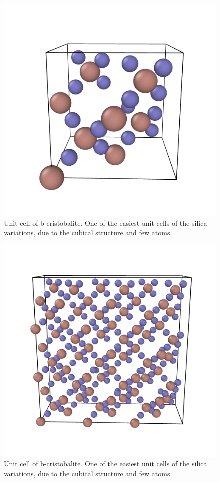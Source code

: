 \documentclass[twoside,english]{uiofysmaster}
\begin{document}
\begin{figure}[H]
\centering
\includegraphics[width=0.7\linewidth]{figures/unitcell/unitcell2.png}
\caption{Unit cell of b-cristobalite. One of the easiest unit cells of the silica variations, due to the cubical structure and few atoms.}
\label{fig:unitcellbcristobalite}
\end{figure}
\begin{figure}[H]
	\centering
	\includegraphics[width=0.7\linewidth]{figures/unitcell/combiningCells.png}
	\caption{Unit cell of b-cristobalite. One of the easiest unit cells of the silica variations, due to the cubical structure and few atoms.}
	\label{fig:unitcellbcristobalite}
\end{figure}
\end{document}
